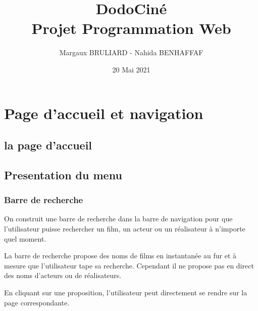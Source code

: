 \documentclass[a4paper, 11pt]{MyReport}
\author{Margaux BRULIARD - Nahida BENHAFFAF}
\title{DodoCiné \\ \vspace*{0.5cm}Projet Programmation Web}
\date{20 Mai 2021}
\begin{document}
	\begin{printTitle}
	\end{printTitle}

	\tableofcontents
	\newpage

	

	

	\chapter{Page d'accueil et navigation}

		\section{la page d'accueil}

		\section{Presentation du menu}

			\subsection{Barre de recherche}

				On construit une barre de recherche dans la barre de navigation pour que l'utilisateur puisse rechercher un film, un acteur ou un réalisateur à n'importe quel moment.

				La barre de recherche propose des noms de films en instantanée au fur et à mesure que l'utilisateur tape sa recherche. Cependant il ne propose pas en direct des noms d'acteurs ou de réalisateurs.

				En cliquant sur une proposition, l'utilisateur peut directement se rendre sur la page correspondante.
\end{document}
